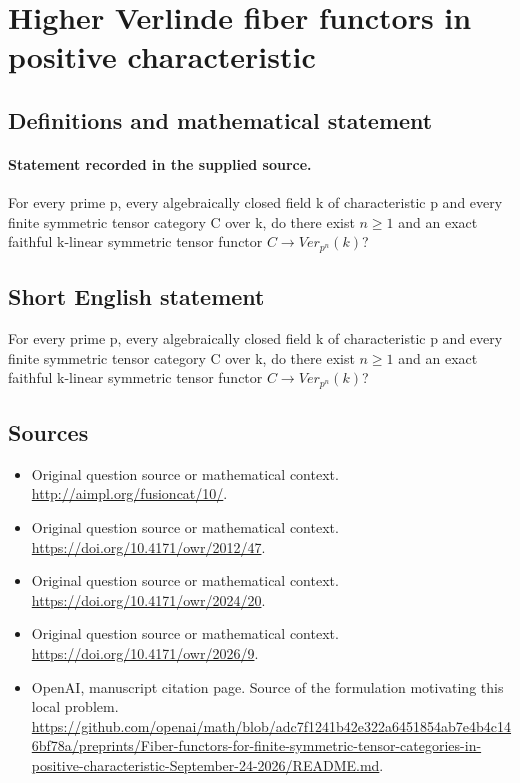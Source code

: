 \documentclass[11pt]{article}
\begin{document}
\section*{Higher Verlinde fiber functors in positive characteristic}\label{statement}
\subsection{Definitions and mathematical statement}
\paragraph{Statement recorded in the supplied source.}
For every prime p, every algebraically closed field k of characteristic p and every finite symmetric tensor category C over k, do there exist $n\geq 1$ and an exact faithful k-linear symmetric tensor functor $C\to Ver_{p^n}(k)$?
\subsection{Short English statement}
For every prime p, every algebraically closed field k of characteristic p and every finite symmetric tensor category C over k, do there exist $n\geq 1$ and an exact faithful k-linear symmetric tensor functor $C\to Ver_{p^n}(k)$?
\subsection{Sources}
\begin{itemize}
\item[S1] Original question source or mathematical context.
\url{http://aimpl.org/fusioncat/10/}.
\item[S2] Original question source or mathematical context.
\url{https://doi.org/10.4171/owr/2012/47}.
\item[S3] Original question source or mathematical context.
\url{https://doi.org/10.4171/owr/2024/20}.
\item[S4] Original question source or mathematical context.
\url{https://doi.org/10.4171/owr/2026/9}.
\item[S5] OpenAI, manuscript citation page. Source of the formulation motivating this local problem.
\url{https://github.com/openai/math/blob/adc7f1241b42e322a6451854ab7e4b4c146bf78a/preprints/Fiber-functors-for-finite-symmetric-tensor-categories-in-positive-characteristic-September-24-2026/README.md}.
\end{itemize}
\end{document}
